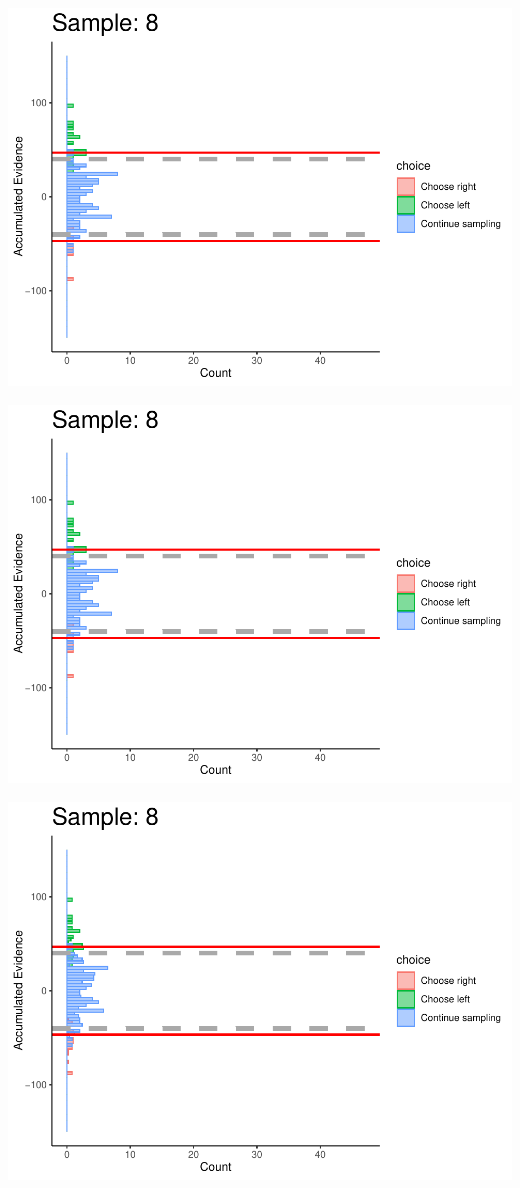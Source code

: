 \documentclass[
]{book}
\begin{document}
\begin{center}\includegraphics[width=0.8\linewidth]{LateNightBayes_files/figure-latex/collapsing_dcb-74} \end{center}

\begin{center}\includegraphics[width=0.8\linewidth]{LateNightBayes_files/figure-latex/collapsing_dcb-75} \end{center}

\begin{center}\includegraphics[width=0.8\linewidth]{LateNightBayes_files/figure-latex/collapsing_dcb-76} \end{center}
\end{document}
